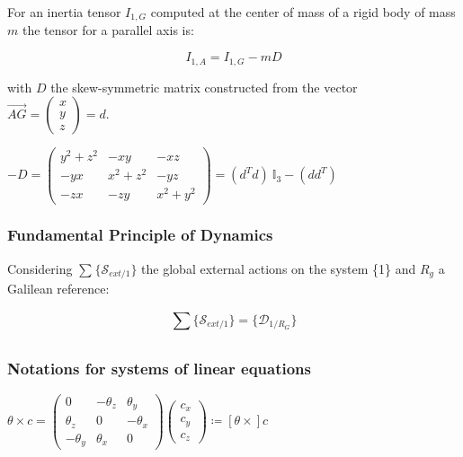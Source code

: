 \documentclass[a4paper, 11pt]{article}
\begin{document}
For an inertia tensor $I_{1, G}$ computed at the center of mass of a rigid body of mass $m$ the tensor for a parallel axis is:

\begin{equation}
 \label{pat}
 I_{1, A} = I_{1, G} - m D
\end{equation}

with $D$ the skew-symmetric matrix constructed from the vector $\overrightarrow{AG} = \begin{pmatrix}
x \\
y \\
z
\end{pmatrix}
=d$.

{\centering
 $ -D = \begin{pmatrix}
 y^2 + z^2 & -xy & -xz \\
 -yx & x^2 + z^2 & -yz \\
 -zx & -zy & x^2 + y^2
 \end{pmatrix}
 = (d^T d) \ \mathbb{I}_3 - (d d^T)$
 \par}


\subsubsection{Fundamental Principle of Dynamics}

Considering $\sum_{}^{} \{ \mathcal{S}_{ext/1} \}$ the global external actions on the system \{1\} and $R_g$ a Galilean reference:

\begin{equation}
 \sum_{}^{} \{ \mathcal{S}_{ext/1} \} = \{ \mathcal{D}_{1/R_G} \}
 \label{fdp}
\end{equation}


\subsubsection{Notations for systems of linear equations}

{\centering
 $ \theta \times c =
 \begin{pmatrix}
  0         & -\theta_z & \theta_y  \\
  \theta_z  & 0         & -\theta_x \\
  -\theta_y & \theta_x  & 0
 \end{pmatrix}
 \begin{pmatrix}
  c_x \\
  c_y \\
  c_z
 \end{pmatrix}
 \coloneqq \left[ \theta \times \right] c$
 \par}
\end{document}
